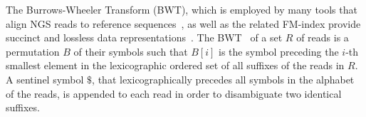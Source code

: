 \documentclass[11pt,oneside,a4paper]{article}
\begin{document}

The Burrows-Wheeler Transform (BWT), which is employed by many tools that align NGS reads to reference sequences~\cite{Li15072009,Langmead2009}, as well as the related FM-index provide succinct and lossless data representations~\cite{cox_large-scale_2012}.
The BWT~\cite{Burrows1994} of a set $R$ of reads is
a permutation $B$ of their symbols such that $B[i]$ is the symbol preceding the
$i$-th smallest element in the lexicographic ordered set of all suffixes of the
reads in $R$.
A sentinel symbol $\$$, that lexicographically precedes all symbols in
the alphabet of the reads, is appended to each read in order to disambiguate two identical suffixes.
\end{document}
